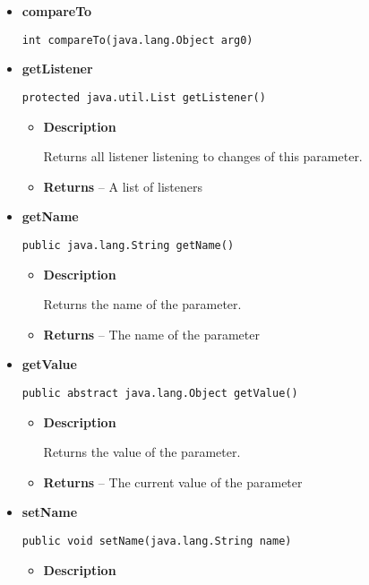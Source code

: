 {{{{{{{\begin{itemize}
{\begin{itemize}
{Add a listener who gets triggered when a change of the value occurs.
}
\item{
{\bf  Parameters}
  \begin{itemize}
   \item{
\texttt{listener} -- The listener to add}
  \end{itemize}
}%
\end{itemize}
}%
\item{ 
{\bf  compareTo}\\
\begin{lstlisting}[frame=none]
int compareTo(java.lang.Object arg0)\end{lstlisting} %
}%
\item{ 
{\bf  getListener}\\
\begin{lstlisting}[frame=none]
protected java.util.List getListener()\end{lstlisting} %
\begin{itemize}
\item{
{\bf  Description}

Returns all listener listening to changes of this parameter.
}
\item{{\bf  Returns} -- 
A list of listeners 
}%
\end{itemize}
}%
\item{ 
{\bf  getName}\\
\begin{lstlisting}[frame=none]
public java.lang.String getName()\end{lstlisting} %
\begin{itemize}
\item{
{\bf  Description}

Returns the name of the parameter.
}
\item{{\bf  Returns} -- 
The name of the parameter 
}%
\end{itemize}
}%
\item{ 
{\bf  getValue}\\
\begin{lstlisting}[frame=none]
public abstract java.lang.Object getValue()\end{lstlisting} %
\begin{itemize}
\item{
{\bf  Description}

Returns the value of the parameter.
}
\item{{\bf  Returns} -- 
The current value of the parameter 
}%
\end{itemize}
}%
\item{ 
{\bf  setName}\\
\begin{lstlisting}[frame=none]
public void setName(java.lang.String name)\end{lstlisting} %
\begin{itemize}
\item{
{\bf  Description}

}
\end{itemize}}
\end{itemize}}}}}}}}
